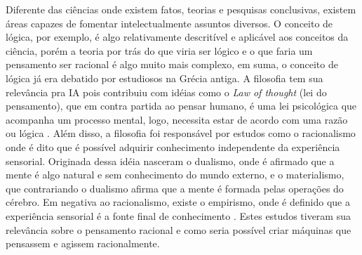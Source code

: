 Diferente das ciências onde existem fatos, teorias e pesquisas conclusivas, existem áreas capazes de fomentar intelectualmente assuntos diversos. O conceito de lógica, por exemplo, é algo relativamente descritível e aplicável aos conceitos da ciência, porém a teoria por trás do que viria ser lógico e o que faria um pensamento ser racional é algo muito mais complexo, em suma, o conceito de lógica já era debatido por estudiosos na Grécia antiga. A filosofia tem sua relevância pra IA pois contribuiu com idéias como o \textit{Law of thought} (lei do pensamento), que em contra partida ao pensar humano, é uma lei psicológica que acompanha um processo mental, logo, necessita estar de acordo com uma razão ou lógica \cite{frege1956thought, russell2003artificial}. Além disso, a filosofia foi responsável por estudos como o racionalismo onde é dito que é possível adquirir conhecimento independente da experiência sensorial. Originada dessa idéia nasceram o dualismo, onde é afirmado que a mente é algo natural e sem conhecimento do mundo externo, e o materialismo, que contrariando o dualismo afirma que a mente é formada pelas operações do cérebro. Em negativa ao racionalismo, existe o empirismo, onde é definido que a experiência sensorial é a fonte final de conhecimento \cite[6]{rationalismvsempiricism, descartes2013rene, russell2003artificial}. Estes estudos tiveram sua relevância sobre o pensamento racional e como seria possível criar máquinas que pensassem e agissem racionalmente.
